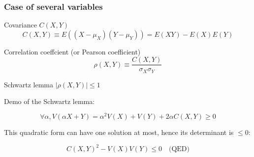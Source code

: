\documentclass[9pt]{beamer}
\begin{document}
\begin{frame}
 \frametitle{Case of several variables}
 
 \begin{block}{Covariance $C(X,Y)$}
  $$C(X,Y) \equiv E \left( (X-\mu_X) (Y-\mu_Y) \right) = E(XY) - E(X) E(Y)$$
 \end{block}
 
 \begin{block}{Correlation coeffcient (or Pearson coefficient)}
  $$\rho(X,Y) \equiv \frac{C(X,Y)}{\sigma_X \sigma_Y}$$
 \end{block}
 
 \begin{block}{Schwartz lemma}
  $|\rho(X,Y)| \leq 1$
 \end{block}

 Demo of the Schwartz lemma:
 
 $$\forall \alpha, V(\alpha X + Y) = \alpha^2 V(X) + V(Y) + 2 \alpha C(X,Y) \geq 0$$
 
 This quadratic form can have one solution at most, hence its determinant is $\leq 0$: 
 
 $$C(X,Y)^2 - V(X) V(Y) \leq 0 \quad \text{(QED)}$$ 


\end{frame}
\end{document}

